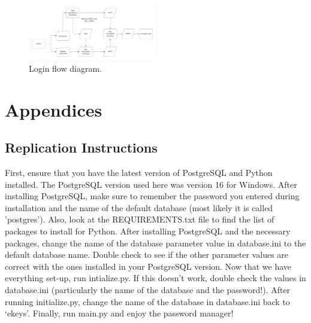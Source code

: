 \documentclass[10pt,twocolumn]{article}
\begin{document}
\begin{figure}[h]
    \centering
    \includegraphics[width=0.5\textwidth]{Login Flow.png}
    \caption{Login flow diagram.}
    \label{LoginFlow}
\end{figure}

\section{Appendices}

\subsection{Replication Instructions}
First, ensure that you have the latest version of PostgreSQL and Python installed. The PostgreSQL version used here was version 16 for Windows. After installing PostgreSQL, make sure to remember the password you entered during installation and the name of the default database (most likely it is called 'postgres'). Also, look at the REQUIREMENTS.txt file to find the list of packages to install for Python. After installing PostgreSQL and the necessary packages, change the name of the database parameter value in database.ini to the default database name. Double check to see if the other parameter values are correct with the ones installed in your PostgreSQL version. Now that we have everything set-up, run intialize.py. If this doesn't work, double check the values in database.ini (particularly the name of the database and the password!). After running initialize.py, change the name of the database in database.ini back to `ekeys'. Finally, run main.py and enjoy the password manager!
\end{document}
